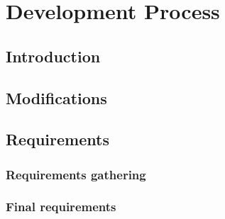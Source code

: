 \chapter{Development Process}

\section{Introduction}


\section{Modifications}

\section{Requirements}


\subsection{Requirements gathering}


\subsection{Final requirements}



